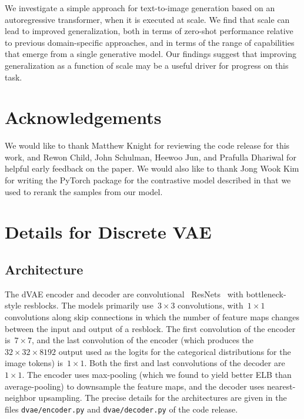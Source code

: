 \documentclass{article}
\begin{document}
We investigate a simple approach for text-to-image generation based on an autoregressive transformer, when it is executed at scale. We find that scale can lead to improved generalization, both in terms of zero-shot performance relative to previous domain-specific approaches, and in terms of the range of capabilities that emerge from a single generative model. Our findings suggest that improving generalization as a function of scale may be a useful driver for progress on this task.


\section*{Acknowledgements}

We would like to thank Matthew Knight for reviewing the code release for this work, and Rewon Child, John Schulman, Heewoo Jun, and Prafulla Dhariwal for helpful early feedback on the paper. We would also like to thank Jong Wook Kim for writing the PyTorch package for the contrastive model described in \citet{radford2019language} that we used to rerank the samples from our model.




\newpage\appendix\onecolumn
\section{Details for Discrete VAE}

\subsection{Architecture}
\label{sec:dvae_arch}

The dVAE encoder and decoder are convolutional~\cite{lecun1998gradient} ResNets~\cite{he2016identity} with bottleneck-style resblocks. The models primarily use~$3 \times 3$ convolutions, with~$1 \times 1$ convolutions along skip connections in which the number of feature maps changes between the input and output of a resblock. The first convolution of the encoder is~$7 \times 7$, and the last convolution of the encoder (which produces the~$32 \times 32 \times 8192$ output used as the logits for the categorical distributions for the image tokens) is~$1 \times 1$. Both the first and last convolutions of the decoder are~$1 \times 1$. The encoder uses max-pooling (which we found to yield better ELB than average-pooling) to downsample the feature maps, and the decoder uses nearest-neighbor upsampling. The precise details for the architectures are given in the files \texttt{dvae/encoder.py} and \texttt{dvae/decoder.py} of the code release.
\end{document}
